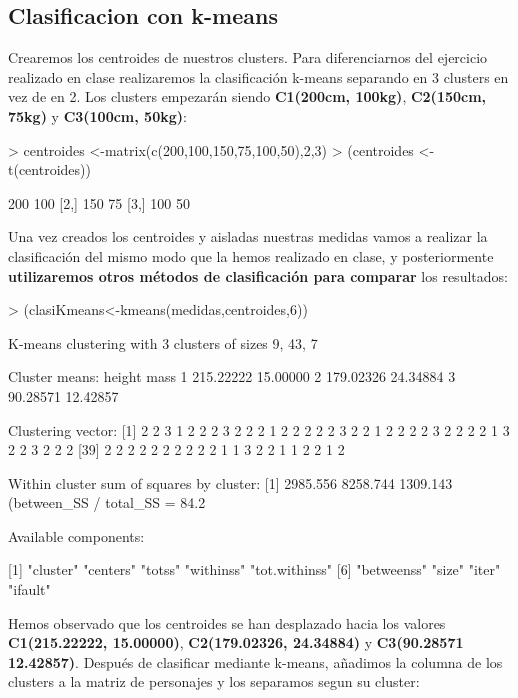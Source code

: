 \documentclass [a4paper] {article}
\begin{document}
\subsection{Clasificacion con k-means}

Crearemos los centroides de nuestros clusters. Para diferenciarnos del ejercicio realizado en clase realizaremos la clasificación
k-means separando en 3 clusters en vez de en 2. Los clusters empezarán siendo \textbf{C1(200cm, 100kg)}, \textbf{C2(150cm, 75kg)} y
 \textbf{C3(100cm, 50kg)}:

\begin{Schunk}
\begin{Sinput}
> centroides <-matrix(c(200,100,150,75,100,50),2,3)
> (centroides <- t(centroides))
\end{Sinput}
\begin{Soutput}
     [,1] [,2]
[1,]  200  100
[2,]  150   75
[3,]  100   50
\end{Soutput}
\end{Schunk}

Una vez creados los centroides y aisladas nuestras medidas vamos a realizar la clasificación del mismo modo que la hemos realizado 
en clase, y posteriormente \textbf{utilizaremos otros métodos de clasificación para comparar} los resultados:

\begin{Schunk}
\begin{Sinput}
> (clasiKmeans<-kmeans(medidas,centroides,6))
\end{Sinput}
\begin{Soutput}
K-means clustering with 3 clusters of sizes 9, 43, 7

Cluster means:
     height     mass
1 215.22222 15.00000
2 179.02326 24.34884
3  90.28571 12.42857

Clustering vector:
 [1] 2 2 3 1 2 2 2 3 2 2 2 1 2 2 2 2 2 3 2 2 1 2 2 2 2 3 2 2 2 2 1 3 2 2 3 2 2 2
[39] 2 2 2 2 2 2 2 2 2 2 1 1 3 2 2 1 1 2 2 1 2

Within cluster sum of squares by cluster:
[1] 2985.556 8258.744 1309.143
 (between_SS / total_SS =  84.2 %)

Available components:

[1] "cluster"      "centers"      "totss"        "withinss"     "tot.withinss"
[6] "betweenss"    "size"         "iter"         "ifault"      
\end{Soutput}
\end{Schunk}

Hemos observado que los centroides se han desplazado hacia los valores \textbf{C1(215.22222, 15.00000)}, \textbf{C2(179.02326, 24.34884)}
y \textbf{C3(90.28571 12.42857)}.
Después de clasificar mediante k-means, añadimos la columna de los clusters a la matriz de personajes y los separamos segun su cluster:
\end{document}
